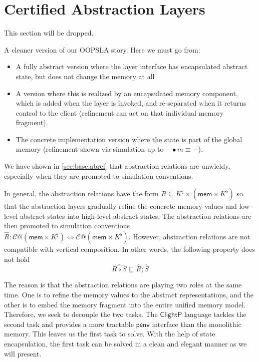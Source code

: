 \documentclass[acmsmall,screen,review,anonymous]{acmart}
\newcommand{\kw}[1]{\ensuremath{ \mathsf{#1} }}
\newcommand{\ClightP}{\ensuremath{ \mathsf{ClightP} }}
\begin{document}

\section{Certified Abstraction Layers} \label{sec:cal} %

This section will be dropped.

{
\color{gray}
A cleaner version of our OOPSLA story.
Here we must go from:
\begin{itemize}
  \item A fully abstract version where the layer interface
    has encapsulated abstract state,
    but does not change the memory at all
  \item A version where this is realized by an encapsulated
    memory component,
    which is added when the layer is invoked,
    and re-separated when it returns control to the client
    (refinement can act on that individual memory fragment).
  \item The concrete implementation version
    where the state is part of the global memory
    (refinement shown via
    simulation up to ${-} \bullet m \equiv {-}$).
\end{itemize}
}

We have shown in \ref{sec:base:abrel} that
abstraction relations are unwieldy,
especially when they are promoted to simulation conventions.

In general, the abstraction relations have the form
$R \subseteq K^\sharp \times (\kw{mem} \times K^\flat)$
so that the abstraction layers gradually refine
the concrete memory values and low-level abstract states
into high-level abstract states.
The abstraction relations are then promoted to simulation conventions
$\hat{R}: \mathcal{C}@(\kw{mem}\times K^\sharp)
\Leftrightarrow \mathcal{C}@(\kw{mem}\times K^\flat)$.
However, abstraction relations are not compatible with
vertical composition.
In other words, the following property does not hold
\[
   \hat{R \circ S} \sqsubseteq \hat{R}; \hat{S}
\]

The reason is that the abstraction relations
are playing two roles at the same time.
One is to refine the memory values to the abstract representations,
and the other is to embed the memory fragment
into the entire unified memory model.
Therefore, we seek to decouple the two tasks.
The $\ClightP$ language tackles the second task
and provides a more tractable $\kw{penv}$ interface
than the monolithic memory.
This leaves us the first task to solve.
With the help of state encapsulation,
the first task can be solved in a clean and elegant manner
as we will present.
\end{document}
